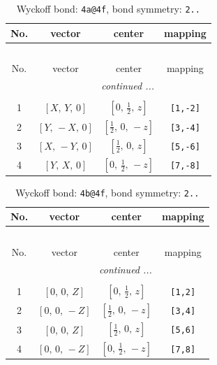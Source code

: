 \documentclass[fleqn,8pt]{jsarticle}
\begin{document}
\begin{longtable}{cccc}
\caption{Wyckoff bond: {\tt 4a@4f}, bond symmetry: {\tt 2..}}
 \\
 \hline \hline
No. & vector & center & mapping \\ \hline \endfirsthead

\multicolumn{3}{l}{\tablename\ \thetable{}} \\
 \hline \hline
No. & vector & center & mapping \\ \hline \endhead

 \hline \hline
\multicolumn{3}{r}{\footnotesize\it continued ...} \\ \endfoot

 \hline \hline
\multicolumn{3}{r}{} \\ \endlastfoot

1 & $\left[ X,\, Y,\, 0 \right]$ & $\left[ 0,\, \frac{1}{2},\, z \right]$ & {\tt [1,-2]} \\ \hline
2 & $\left[ Y,\, - X,\, 0 \right]$ & $\left[ \frac{1}{2},\, 0,\, - z \right]$ & {\tt [3,-4]} \\ \hline
3 & $\left[ X,\, - Y,\, 0 \right]$ & $\left[ \frac{1}{2},\, 0,\, z \right]$ & {\tt [5,-6]} \\ \hline
4 & $\left[ Y,\, X,\, 0 \right]$ & $\left[ 0,\, \frac{1}{2},\, - z \right]$ & {\tt [7,-8]} \\
\end{longtable}
\renewcommand{\arraystretch}{1.2}
\begin{longtable}{cccc}
\caption{Wyckoff bond: {\tt 4b@4f}, bond symmetry: {\tt 2..}}
 \\
 \hline \hline
No. & vector & center & mapping \\ \hline \endfirsthead

\multicolumn{3}{l}{\tablename\ \thetable{}} \\
 \hline \hline
No. & vector & center & mapping \\ \hline \endhead

 \hline \hline
\multicolumn{3}{r}{\footnotesize\it continued ...} \\ \endfoot

 \hline \hline
\multicolumn{3}{r}{} \\ \endlastfoot

1 & $\left[ 0,\, 0,\, Z \right]$ & $\left[ 0,\, \frac{1}{2},\, z \right]$ & {\tt [1,2]} \\ \hline
2 & $\left[ 0,\, 0,\, - Z \right]$ & $\left[ \frac{1}{2},\, 0,\, - z \right]$ & {\tt [3,4]} \\ \hline
3 & $\left[ 0,\, 0,\, Z \right]$ & $\left[ \frac{1}{2},\, 0,\, z \right]$ & {\tt [5,6]} \\ \hline
4 & $\left[ 0,\, 0,\, - Z \right]$ & $\left[ 0,\, \frac{1}{2},\, - z \right]$ & {\tt [7,8]} \\
\end{longtable}
\end{document}
